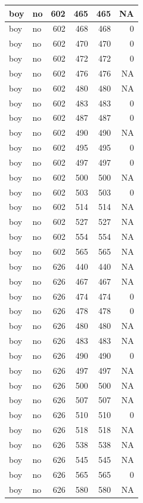 \documentclass[man]{apa6}
\begin{document}
\begin{tabular}{l|l|r|r|r|r}
\hline
boy & no & 602 & 465 & 465 & NA\\
\hline
boy & no & 602 & 468 & 468 & 0\\
\hline
boy & no & 602 & 470 & 470 & 0\\
\hline
boy & no & 602 & 472 & 472 & 0\\
\hline
boy & no & 602 & 476 & 476 & NA\\
\hline
boy & no & 602 & 480 & 480 & NA\\
\hline
boy & no & 602 & 483 & 483 & 0\\
\hline
boy & no & 602 & 487 & 487 & 0\\
\hline
boy & no & 602 & 490 & 490 & NA\\
\hline
boy & no & 602 & 495 & 495 & 0\\
\hline
boy & no & 602 & 497 & 497 & 0\\
\hline
boy & no & 602 & 500 & 500 & NA\\
\hline
boy & no & 602 & 503 & 503 & 0\\
\hline
boy & no & 602 & 514 & 514 & NA\\
\hline
boy & no & 602 & 527 & 527 & NA\\
\hline
boy & no & 602 & 554 & 554 & NA\\
\hline
boy & no & 602 & 565 & 565 & NA\\
\hline
boy & no & 626 & 440 & 440 & NA\\
\hline
boy & no & 626 & 467 & 467 & NA\\
\hline
boy & no & 626 & 474 & 474 & 0\\
\hline
boy & no & 626 & 478 & 478 & 0\\
\hline
boy & no & 626 & 480 & 480 & NA\\
\hline
boy & no & 626 & 483 & 483 & NA\\
\hline
boy & no & 626 & 490 & 490 & 0\\
\hline
boy & no & 626 & 497 & 497 & NA\\
\hline
boy & no & 626 & 500 & 500 & NA\\
\hline
boy & no & 626 & 507 & 507 & NA\\
\hline
boy & no & 626 & 510 & 510 & 0\\
\hline
boy & no & 626 & 518 & 518 & NA\\
\hline
boy & no & 626 & 538 & 538 & NA\\
\hline
boy & no & 626 & 545 & 545 & NA\\
\hline
boy & no & 626 & 565 & 565 & 0\\
\hline
boy & no & 626 & 580 & 580 & NA\\

\end{tabular}
\end{document}
